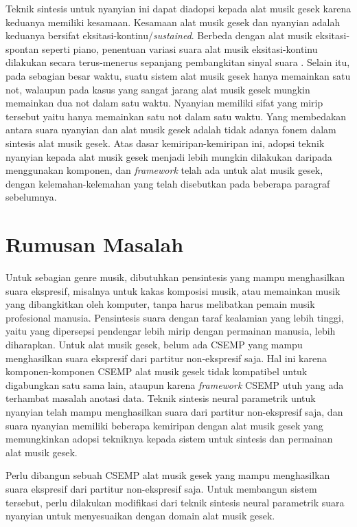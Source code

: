 Teknik sintesis untuk nyanyian ini dapat diadopsi kepada alat musik gesek karena keduanya memiliki kesamaan. Kesamaan alat musik gesek dan nyanyian adalah keduanya bersifat eksitasi-kontinu/\textit{sustained}. Berbeda dengan alat musik eksitasi-spontan seperti piano, penentuan variasi suara alat musik eksitasi-kontinu dilakukan secara terus-menerus sepanjang pembangkitan sinyal suara \parencite{Maestre2010StatisticalMO}. Selain itu, pada sebagian besar waktu, suatu sistem alat musik gesek hanya memainkan satu not, walaupun pada kasus yang sangat jarang alat musik gesek mungkin memainkan dua not dalam satu waktu. Nyanyian memiliki sifat yang mirip tersebut yaitu hanya memainkan satu not dalam satu waktu. Yang membedakan antara suara nyanyian dan alat musik gesek adalah tidak adanya fonem dalam sintesis alat musik gesek. Atas dasar kemiripan-kemiripan ini, adopsi teknik nyanyian kepada alat musik gesek menjadi lebih mungkin dilakukan daripada menggunakan komponen, dan \textit{framework} telah ada untuk alat musik gesek, dengan kelemahan-kelemahan yang telah disebutkan pada beberapa paragraf sebelumnya.

\section{Rumusan Masalah}

Untuk sebagian genre musik, dibutuhkan pensintesis yang mampu menghasilkan suara ekspresif, misalnya untuk kakas komposisi musik, atau memainkan musik yang dibangkitkan oleh komputer, tanpa harus melibatkan pemain musik profesional manusia. Pensintesis suara dengan taraf kealamian yang lebih tinggi, yaitu yang dipersepsi pendengar lebih mirip dengan permainan manusia, lebih diharapkan. Untuk alat musik gesek, belum ada CSEMP yang mampu menghasilkan suara ekspresif dari partitur non-ekspresif saja. Hal ini karena komponen-komponen CSEMP alat musik gesek tidak kompatibel untuk digabungkan satu sama lain, ataupun karena \textit{framework} CSEMP utuh yang ada terhambat masalah anotasi data. Teknik sintesis neural parametrik untuk nyanyian telah mampu menghasilkan suara dari partitur non-ekspresif saja, dan suara nyanyian memiliki beberapa kemiripan dengan alat musik gesek yang memungkinkan adopsi tekniknya kepada sistem untuk sintesis dan permainan alat musik gesek.

Perlu dibangun sebuah CSEMP alat musik gesek yang mampu menghasilkan suara ekspresif dari partitur non-ekspresif saja. Untuk membangun sistem tersebut, perlu dilakukan modifikasi dari teknik sintesis neural parametrik suara nyanyian untuk menyesuaikan dengan domain alat musik gesek. %

